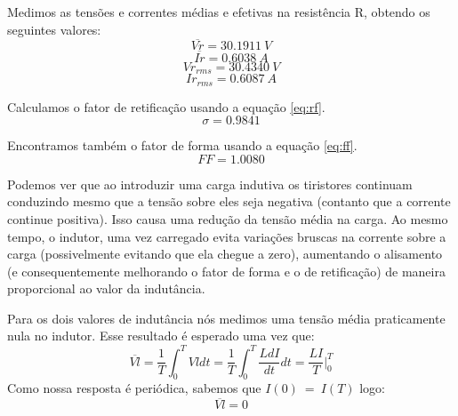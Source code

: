 \documentclass{report}
\begin{document}
Medimos as tensões e correntes médias e efetivas na resistência R, obtendo os seguintes valores:
\begin{equation}
\overline{Vr} = 30.1911\ V
\end{equation}
\begin{equation}
\overline{Ir} =  0.6038\ A
\end{equation}
\begin{equation}
Vr_{rms} =  30.4340\ V
\end{equation}
\begin{equation}
Ir_{rms} =    0.6087\ A
\end{equation}

Calculamos o fator de retificação usando a equação \ref{eq:rf}.
\begin{equation}
\sigma =  0.9841
\end{equation}

Encontramos também o fator de forma usando a equação \ref{eq:ff}.
\begin{equation}
FF = 1.0080
\end{equation}

Podemos ver que ao introduzir uma carga indutiva os tiristores continuam conduzindo mesmo que a tensão sobre eles seja negativa (contanto que a corrente continue positiva). Isso causa uma redução da tensão média na carga. Ao mesmo tempo, o indutor, uma vez carregado evita variações bruscas na corrente sobre a carga (possivelmente evitando que ela chegue a zero), aumentando o alisamento (e consequentemente melhorando o fator de forma e o de retificação) de maneira proporcional ao valor da indutância.

Para os dois valores de indutância nós medimos uma tensão média praticamente nula no indutor. Esse resultado é esperado uma vez que:
\begin{equation}
	\overline{Vl} = \frac{1}{T}\int_{0}^{T}Vl dt = \frac{1}{T}\int_{0}^{T}\frac{LdI}{dt} dt = \frac{LI}{T}\bigg\rvert_0^T
\end{equation}
Como nossa resposta é periódica, sabemos que $I(0)\ =\ I(T)$ logo:
\begin{equation}
	\overline{Vl} = 0
\end{equation}
\end{document}
